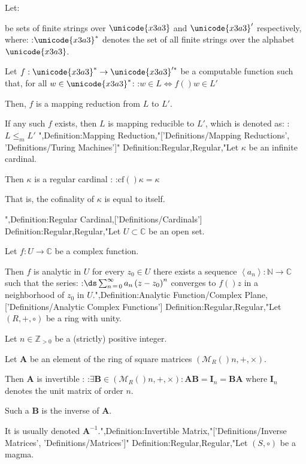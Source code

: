 Let:






be sets of finite strings over $\unicode{x3a3}$ and $\unicode{x3a3}'$ respectively, where:
:$\unicode{x3a3}^*$ denotes the set of all finite strings over the alphabet $\unicode{x3a3}$.

Let $f : \unicode{x3a3}^* \to \unicode{x3a3}'^*$ be a computable function such that, for all $w \in \unicode{x3a3}^*$:
:$w \in L \iff f \left(   \right)w \in L'$

Then, $f$ is a mapping reduction from $L$ to $L'$.


If any such $f$ exists, then $L$ is mapping reducible to $L'$, which is denoted as:
:$L \le_m L'$
",Definition:Mapping Reduction,"['Definitions/Mapping Reductions', 'Definitions/Turing Machines']"
Definition:Regular,Regular,"Let $\kappa$ be an infinite cardinal.


Then $\kappa$ is a regular cardinal :
:$\mathrm {cf}  \left(   \right)\kappa = \kappa$

That is,  the cofinality of $\kappa$ is equal to itself.

",Definition:Regular Cardinal,['Definitions/Cardinals']
Definition:Regular,Regular,"Let $U \subset \mathbb C$ be an open set.

Let $f : U \to \mathbb C$ be a complex function.


Then $f$ is analytic in $U$  for every $z_0 \in U$ there exists a sequence $\left\langle a_n \right\rangle: \mathbb N \to \mathbb C$ such that the series:
:$\ds \sum_{n \mathop = 0}^\infty a_n \left( z - z_0 \right)^n$
converges to $f \left(   \right)z$ in a neighborhood of $z_0$ in $U$.",Definition:Analytic Function/Complex Plane,['Definitions/Analytic Complex Functions']
Definition:Regular,Regular,"Let $\left( R, +, \circ \right)$ be a ring with unity.

Let $n \in \mathbb Z_{>0}$ be a (strictly) positive integer.

Let $\mathbf A$ be an element of the ring of square matrices $\left( \mathcal M_R \left(   \right)n, +, \times \right)$.


Then $\mathbf A$ is invertible :
:$\exists \mathbf B \in \left( \mathcal M_R \left(   \right)n, +, \times \right): \mathbf A \mathbf B = \mathbf I_n = \mathbf B \mathbf A$
where $\mathbf I_n$ denotes the unit matrix of order $n$.


Such a $\mathbf B$ is the inverse of $\mathbf A$.

It is usually denoted $\mathbf A^{-1}$.",Definition:Invertible Matrix,"['Definitions/Inverse Matrices', 'Definitions/Matrices']"
Definition:Regular,Regular,"Let $\left( S, \circ \right)$ be a magma.

